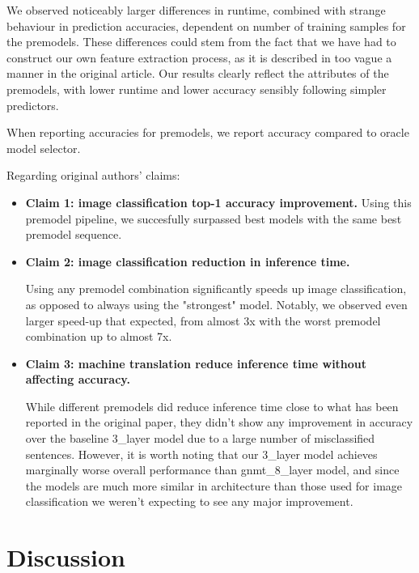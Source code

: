We observed noticeably larger differences in runtime, combined with strange behaviour in prediction accuracies, dependent on number of training samples for the premodels. These differences could stem from the fact that we have had to construct our own feature extraction process, as it is described in too vague a manner in the original article. Our results clearly reflect the attributes of the premodels, with lower runtime and lower accuracy sensibly following simpler predictors.

When reporting accuracies for premodels, we report accuracy compared to oracle model selector.

Regarding original authors' claims:
\begin{itemize}
	\item \textbf{Claim 1: image classification top-1 accuracy improvement.}
	      Using this premodel pipeline, we succesfully surpassed best models with the same best premodel sequence.
	      	      
	\item \textbf{Claim 2: image classification reduction in inference time.}
	      	      
	      Using any premodel combination significantly speeds up image classification, as opposed to always using the "strongest" model. Notably, we observed even larger speed-up that expected, from almost 3x with the worst premodel combination up to almost 7x.
	      	      
	\item \textbf{Claim 3: machine translation reduce inference time without affecting accuracy.}
	      	      
	      While different premodels did reduce inference time close to what has been reported in the original paper, they didn't show any improvement in accuracy over the baseline 3\_layer model due to a large number of misclassified sentences. However, it is worth noting that our 3\_layer model achieves marginally worse overall performance than gnmt\_8\_layer model, and since the models are much more similar in architecture than those used for image classification we weren't expecting to see any major improvement.
	      	      
\end{itemize}



\section{Discussion}

